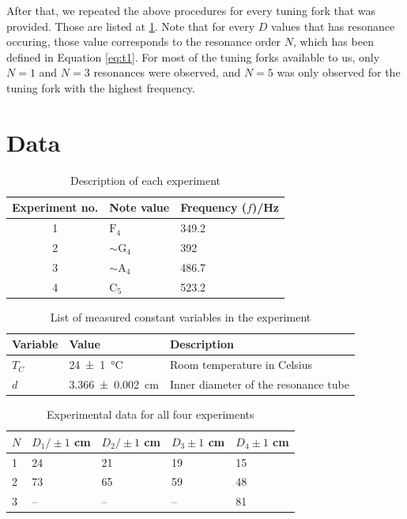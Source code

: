 \documentclass[letter]{article}
\numberwithin{equation}{section}
\begin{document}
After that, we repeated the above procedures for every tuning fork that was provided. Those are listed at \ref{table:d1}. Note that for every \(D\) values that has resonance occuring, those value corresponds to the resonance order \(N\), which has been defined in Equation \eqref{eq:t1}. For most of the tuning forks available to us, only \(N = 1\) and \(N = 3\) resonances were observed, and \(N = 5\) was only observed for the tuning fork with the highest frequency.

\pagebreak
\section{Data}
\begin{table}[!h]
  \centering
  \begin{tabular}{|c|l|l|}
    \hline
    Experiment no.  & Note value            & Frequency (\(f\))/\si{Hz} \\
    \hline
    1               & \(\mathrm{F}_4\)      & 349.2 \\
    2               & \(\sim \mathrm{G}_4\) & 392 \\
    3               & \(\sim \mathrm{A}_4\) & 486.7 \\
    4               & \(\mathrm{C}_5\)      & 523.2 \\
    \hline
  \end{tabular}
  \caption{Description of each experiment}
  \label{table:d1}
\end{table}

\begin{table}[!h]
  \centering
  \begin{tabular}{|l|l|l|}
    \hline
    Variable  & Value                       & Description\\
    \hline
    \(T_C\)   & \SI{24(1)}{\celsius}        & {Room temperature in Celsius}\\
    \(d\)     & \SI{3.366(2)}{\centi\metre} & {Inner diameter of the resonance tube}\\
    \hline
  \end{tabular}
  \caption{List of measured constant variables in the experiment}
  \label{table:d2}
\end{table}

\begin{table}[!h]
  \centering
  \begin{tabular}{|l|l|l|l|l|}
    \hline
    \(N\) & \(D_1 / \pm 1\) \si{cm} & \(D_2 / \pm 1\) \si{cm} & \(D_3 \pm 1\) \si{cm} & \(D_4 \pm 1\) \si{cm} \\
    \hline
    1  & 24  & 21  & 19  & 15 \\
    2  & 73  & 65  & 59  & 48 \\
    3  & --  & --  & --  & 81 \\
    \hline
  \end{tabular}
  \caption{Experimental data for all four experiments}
  \label{table:d3}
\end{table}
\end{document}
